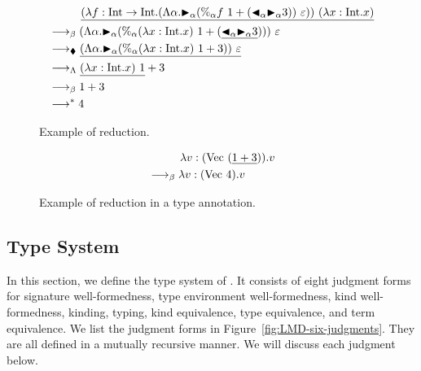 \begin{figure}[tbp]
\begin{align*}
    & \hspace{10mm} \underline{(\lambda f:\I\to\I.(\Lambda\alpha.\TB_\alpha (\%_\alpha f\ 1 + (\TBL_\alpha \TB_\alpha 3))\ \varepsilon))\ (\lambda x:\I.x)} \\
    & \longrightarrow_\beta (\Lambda\alpha.\TB_\alpha (\%_\alpha (\lambda x:\I.x)\ 1 + (\underline{\TBL_\alpha \TB_\alpha 3})))\ \varepsilon        \\
    & \longrightarrow_\blacklozenge \underline{(\Lambda\alpha.\TB_\alpha (\%_\alpha (\lambda x:\I.x)\ 1 + 3))\ \varepsilon}                                         \\
    & \longrightarrow_\Lambda \underline{(\lambda x:\I.x)\ 1} + 3                                                                                           \\
    & \longrightarrow_\beta 1 + 3                                                                                                                           \\
    & \longrightarrow^* 4
\end{align*}
    \caption{Example of reduction.}
    \label{fig:example-of-reduction}
\end{figure}

\begin{figure}[tbp]
    \begin{align*}
        & \hspace{10mm} \lambda v:(\text{Vec }(\underline{1+3})).v \\
        & \longrightarrow_\beta \lambda v:(\text{Vec }4).v
    \end{align*}
    \caption{Example of reduction in a type annotation.}
    \label{fig:reduction-in-type-annotations}
\end{figure}

\subsection{Type System}

In this section, we define the type system of \LMD.  It consists of eight
judgment forms for signature well-formedness, type environment well-formedness,
kind well-formedness, kinding, typing, kind equivalence, type equivalence, and
term equivalence.  We list the judgment forms in
Figure~\ref{fig:LMD-six-judgments}. They are all defined in a mutually
recursive manner. We will discuss each judgment below.

